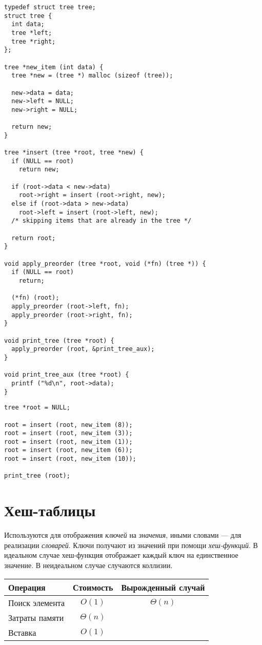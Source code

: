 \lstset{label=lst:bst-impl,caption=Некоторые операции}
\begin{lstlisting}
typedef struct tree tree;
struct tree {
  int data;
  tree *left;
  tree *right;
};

tree *new_item (int data) {
  tree *new = (tree *) malloc (sizeof (tree));

  new->data = data;
  new->left = NULL;
  new->right = NULL;

  return new;
}

tree *insert (tree *root, tree *new) {
  if (NULL == root)
    return new;

  if (root->data < new->data)
    root->right = insert (root->right, new);
  else if (root->data > new->data)
    root->left = insert (root->left, new);
  /* skipping items that are already in the tree */

  return root;
}

void apply_preorder (tree *root, void (*fn) (tree *)) {
  if (NULL == root)
    return;

  (*fn) (root);
  apply_preorder (root->left, fn);
  apply_preorder (root->right, fn);
}

void print_tree (tree *root) {
  apply_preorder (root, &print_tree_aux);
}

void print_tree_aux (tree *root) {
  printf ("%d\n", root->data);
}
\end{lstlisting}

\lstset{label=lst:bst-usage,caption=Пример использования}
\begin{lstlisting}
tree *root = NULL;

root = insert (root, new_item (8));
root = insert (root, new_item (3));
root = insert (root, new_item (1));
root = insert (root, new_item (6));
root = insert (root, new_item (10));

print_tree (root);
\end{lstlisting}

\section{Хеш-таблицы}
\label{sec:hash-tables}

Используются для отображения \emph{ключей} на \emph{значения}, иными словами --- для реализации \emph{словарей}. Ключи получают из значений при помощи \emph{хеш-функций}. В идеальном случае хеш-функция отображает каждый ключ на единственное значение. В неидеальном случае случаются коллизии.

\begin{center}
  \begin{tabular}{lcc}
    \toprule
    Операция & Стоимость & Вырожденный случай \\
    \midrule
    Поиск элемента & $O(1)$ & $\Theta(n)$ \\
    Затраты памяти & $\Theta(n)$ & \\
    Вставка & $O(1)$ & \\
    \bottomrule
  \end{tabular}
\end{center}


